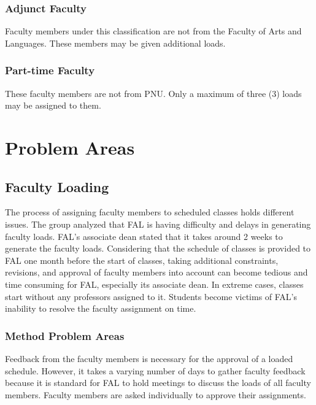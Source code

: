 \subsubsection{Adjunct Faculty}
Faculty members under this classification are not from the Faculty of Arts and Languages. These members may be given additional loads.

\subsubsection{Part-time Faculty}
These faculty members are not from PNU. Only a maximum of three (3) loads may be assigned to them.

\section{Problem Areas}

\subsection{Faculty Loading}
The process of assigning faculty members to scheduled classes holds different issues. The group analyzed that FAL is having difficulty and delays in generating faculty loads. FAL’s associate dean stated that it takes around 2 weeks to generate the faculty loads. Considering that the schedule of classes is provided to FAL one month before the start of classes, taking additional constraints, revisions, and approval of faculty members into account can become tedious and time consuming for FAL, especially its associate dean. In extreme cases, classes start without any professors assigned to it. Students become victims of FAL’s inability to resolve the faculty assignment on time.

\subsubsection{Method Problem Areas}
Feedback from the faculty members is necessary for the approval of a loaded schedule. However, it takes a varying number of days to gather faculty feedback because it is standard for FAL to hold meetings to discuss the loads of all faculty members. Faculty members are asked individually to approve their assignments.

